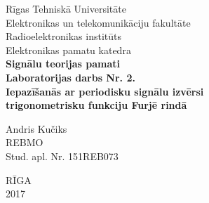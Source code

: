 \documentclass[a4paper,  margin=1in]{report}
\begin{document}
\Large
\begin{center}
    Rīgas Tehniskā Universitāte\\
    Elektronikas un telekomunikāciju fakultāte\\
    Radioelektronikas institūts\\
    Elektronikas pamatu katedra\\ 
    \vspace{50pt}
    \textbf{
        Signālu teorijas pamati\\
        Laboratorijas darbs Nr. 2.\\}
    \vspace{120pt}
    \textbf{
        Iepazīšanās ar periodisku signālu izvērsi\\
        trigonometrisku funkciju Furjē rindā\\
    }

    \vspace{120pt}
\end{center}
\begin{flushright}
    Andris Kučiks\\
    REBMO\\
    Stud. apl. Nr. 151REB073\\
\end{flushright}
\vspace{50pt}
\begin{center}
    RĪGA\\
    2017\\
\end{center}
\vspace{10pt}
\newpage 
\end{document}
